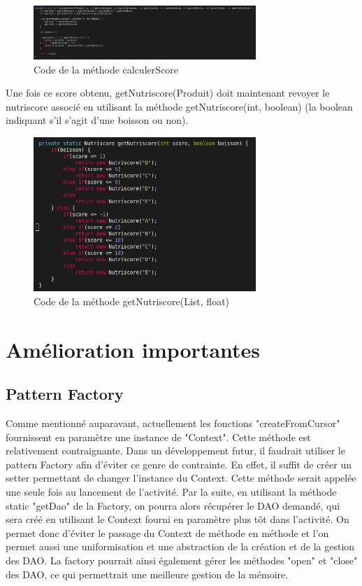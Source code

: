 \documentclass[report]{BetterDocument}
\begin{document}
		\begin{figure}[H]
			\centering\includegraphics[width=0.75\textwidth, keepaspectratio]{img/util/calculerScore.png}
			\caption{Code de la méthode calculerScore}
		\end{figure}

		Une fois ce score obtenu, getNutriscore(Produit) doit maintenant revoyer le nutriscore associé en utilisant la méthode getNutriscore(int, boolean) (la boolean indiquant s'il s'agit d'une boisson ou non).

		\begin{figure}[H]
			\centering\includegraphics[width=0.75\textwidth, keepaspectratio]{img/util/getNutriscore2.png}
			\caption{Code de la méthode getNutriscore(List, float)}
		\end{figure}

	\chapter{Amélioration importantes}

		\section{Pattern Factory}

			Comme mentionné auparavant, actuellement les fonctions "createFromCursor" fournissent en paramètre une instance de "Context". Cette méthode est relativement contraignante. Dans un développement futur, il faudrait utiliser le pattern Factory afin d'éviter ce genre de contrainte. En effet, il suffit de créer un setter permettant de changer l'instance du Context. Cette méthode serait appelée une seule fois au lancement de l'activité. Par la suite, en utilisant la méthode static "getDao" de la Factory, on pourra alors récupérer le DAO demandé, qui sera créé en utilisant le Context fourni en paramètre plus tôt dans l'activité. On permet donc d'éviter le passage du Context de méthode en méthode et l'on permet aussi une uniformisation et une abstraction de la création et de la gestion des DAO. La factory pourrait ainsi également gérer les méthodes "open" et "close" des DAO, ce qui permettrait une meilleure gestion de la mémoire.
\end{document}
